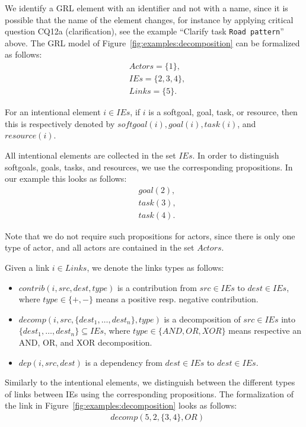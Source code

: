 \rationale{} We identify a GRL element with an identifier and not with a name, since it is possible that the name of the element changes, for instance by applying critical question CQ12a (clarification), see the example ``Clarify task \texttt{Road pattern}'' above. The GRL model of Figure~\ref{fig:examples:decomposition} can be formalized as follows: 
\begin{align*}
&Actors = \{1\},\\
&IEs = \{2, 3, 4\},\\ 
&Links = \{5\}.
\end{align*}

\begin{definition}
For an intentional element $i\in IEs$, if $i$ is a softgoal, goal, task, or resource, then this is respectively denoted by $softgoal(i), goal(i), task(i)$, and $resource(i)$.
\end{definition}

\rationale{} All intentional elements are collected in the set $IEs$. In order to distinguish softgoals, goals, tasks, and resources, we use the corresponding propositions. In our example this looks as follows:
\begin{align*}
&goal(2),\\
&task(3),\\
&task(4).
\end{align*}

Note that we do not require such propositions for actors, since there is only one type of actor, and all actors are contained in the set $Actors$.

\begin{definition}[Links]
Given a link $i\in Links$, we denote the links types as follows:
\begin{itemize}
\item $contrib(i,src,dest,type)$ is a contribution from $src\in IEs$ to $dest\in IEs$, where $type\in\{+,-\}$ means a positive resp. negative contribution. 
\item $decomp(i,src,\{dest_1,\ldots,dest_n\},type)$ is a decomposition of $src\in IEs$ into $\{dest_1,\dots,dest_n\}\subseteq IEs$, where $type\in\{AND,OR,XOR\}$ means respective an AND, OR, and XOR decomposition. 
\item $dep(i,src,dest)$ is a dependency from $dest\in IEs$ to $dest\in IEs$.
\end{itemize}
\end{definition}

\rationale{} Similarly to the intentional elements, we distinguish between the different types of links between IEs using the corresponding propositions. The formalization of the link in Figure~\ref{fig:examples:decomposition} looks as follows:
\begin{align*}
&decomp(5, 2, \{3,4\}, OR)
\end{align*}

